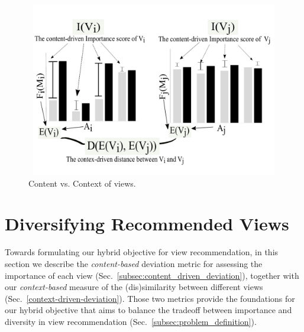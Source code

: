 
\begin{figure}
	\includegraphics[width=6in,height=3in]{figures/introduction/pre2}
	\vspace{-12pt}
	\caption[content vs context]{Content vs. Context of views.}
	\label{fig:content-contex}
\end{figure}


\section{Diversifying Recommended Views}
\label{sec:diversifying_recommended_visualizations}


Towards formulating our hybrid objective for view recommendation, in this section we describe the {\em content-based} deviation metric for assessing the importance of each view (Sec.~\ref{subsec:content_driven_deviation}), together with our {\em context-based} measure of the (dis)similarity between different views (Sec.~\ref{context-driven-deviation}). 
%
Those two metrics provide the foundations for our hybrid objective that aims to balance the tradeoff between importance and diversity in view recommendation (Sec.~\ref{subsec:problem_definition}).  
\vspace{-8pt}


